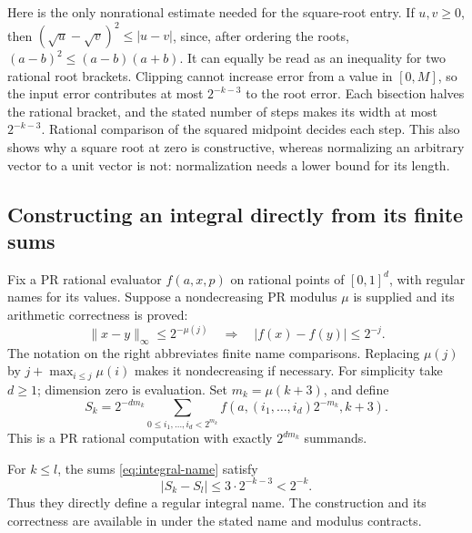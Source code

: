 Here is the only nonrational estimate needed for the square-root entry.
If \(u,v\ge0\), then
\((\sqrt u-\sqrt v)^2\le |u-v|\), since, after ordering the roots,
\((a-b)^2\le(a-b)(a+b)\).  It can equally be read as an inequality for
two rational root brackets.  Clipping cannot increase error from a value
in \([0,M]\), so the input error contributes at most \(2^{-k-3}\) to
the root error.  Each bisection halves the rational bracket, and the
stated number of steps makes its width at most \(2^{-k-3}\).  Rational
comparison of the squared midpoint decides each step.  This also shows
why a square root at zero is constructive, whereas normalizing an
arbitrary vector to a unit vector is not: normalization needs a lower
bound for its length.

\subsection{Constructing an integral directly from its finite sums}

Fix a PR rational evaluator \(f(a,x,p)\) on rational points of
\([0,1]^d\), with regular names for its values.  Suppose a nondecreasing
PR modulus \(\mu\) is supplied and its arithmetic correctness is proved:
\begin{equation}\label{eq:uc}
 \|x-y\|_\infty\le2^{-\mu(j)}
 \quad\Longrightarrow\quad |f(x)-f(y)|\le2^{-j}.
\end{equation}
The notation on the right abbreviates finite name comparisons.  Replacing
\(\mu(j)\) by \(j+\max_{i\le j}\mu(i)\) makes it nondecreasing if
necessary.  For simplicity take \(d\ge1\); dimension zero is evaluation.
Set \(m_k=\mu(k+3)\), and define
\begin{equation}\label{eq:integral-name}
 S_k=2^{-dm_k}
 \sum_{0\le i_1,\ldots,i_d<2^{m_k}}
 f\left(a,(i_1,\ldots,i_d)2^{-m_k},k+3\right).
\end{equation}
This is a PR rational computation with exactly \(2^{dm_k}\) summands.

\begin{theorem}\label{thm:integral}
For \(k\le l\), the sums \eqref{eq:integral-name} satisfy
\[
 |S_k-S_l|\le3\cdot2^{-k-3}<2^{-k}.
\]
Thus they directly define a regular integral name.  The construction and
its correctness are available in \ipra under the stated name and modulus
contracts.
\end{theorem}


